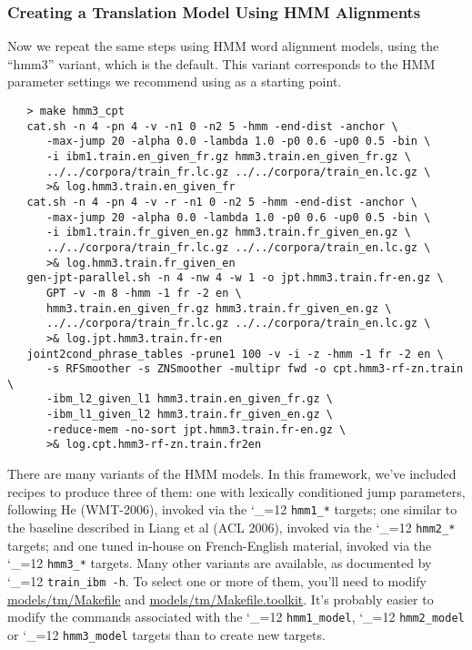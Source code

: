 \documentclass[11pt,letterpaper]{article}
\def\code{\begingroup\catcode`\_=12 \codex}
\newcommand{\codex}[1]{\texttt{#1}\endgroup}
\begin{document}
\subsubsection{Creating a Translation Model Using HMM Alignments} \label{HMM}

Now we repeat the same steps using HMM word alignment models, using the
``hmm3'' variant, which is the default.  This variant corresponds to the HMM
parameter settings we recommend using as a starting point.
\begin{small}
\begin{verbatim}
   > make hmm3_cpt
   cat.sh -n 4 -pn 4 -v -n1 0 -n2 5 -hmm -end-dist -anchor \
      -max-jump 20 -alpha 0.0 -lambda 1.0 -p0 0.6 -up0 0.5 -bin \
      -i ibm1.train.en_given_fr.gz hmm3.train.en_given_fr.gz \
      ../../corpora/train_fr.lc.gz ../../corpora/train_en.lc.gz \
      >& log.hmm3.train.en_given_fr
   cat.sh -n 4 -pn 4 -v -r -n1 0 -n2 5 -hmm -end-dist -anchor \
      -max-jump 20 -alpha 0.0 -lambda 1.0 -p0 0.6 -up0 0.5 -bin \
      -i ibm1.train.fr_given_en.gz hmm3.train.fr_given_en.gz \
      ../../corpora/train_fr.lc.gz ../../corpora/train_en.lc.gz \
      >& log.hmm3.train.fr_given_en
   gen-jpt-parallel.sh -n 4 -nw 4 -w 1 -o jpt.hmm3.train.fr-en.gz \
      GPT -v -m 8 -hmm -1 fr -2 en \
      hmm3.train.en_given_fr.gz hmm3.train.fr_given_en.gz \
      ../../corpora/train_fr.lc.gz ../../corpora/train_en.lc.gz \
      >& log.jpt.hmm3.train.fr-en
   joint2cond_phrase_tables -prune1 100 -v -i -z -hmm -1 fr -2 en \
      -s RFSmoother -s ZNSmoother -multipr fwd -o cpt.hmm3-rf-zn.train  \
      -ibm_l2_given_l1 hmm3.train.en_given_fr.gz \
      -ibm_l1_given_l2 hmm3.train.fr_given_en.gz \
      -reduce-mem -no-sort jpt.hmm3.train.fr-en.gz \
      >& log.cpt.hmm3-rf-zn.train.fr2en
\end{verbatim}
\end{small}

There are many variants of the HMM models.  In this framework, we've included
recipes to produce three of them: one with lexically conditioned jump
parameters, following He (WMT-2006), invoked via the \code{hmm1_*} targets;
one similar to the baseline described in Liang et al (ACL 2006), invoked via
the \code{hmm2_*} targets; and one tuned in-house on French-English
material, invoked via the \code{hmm3_*} targets.  Many other variants are
available, as documented by \code{train_ibm -h}. To select one or more of
them, you'll need to modify \url{models/tm/Makefile} and
\url{models/tm/Makefile.toolkit}. It's probably easier to modify the
commands associated with the \code{hmm1_model}, \code{hmm2_model} or 
\code{hmm3_model} targets than to create new targets.
\end{document}
